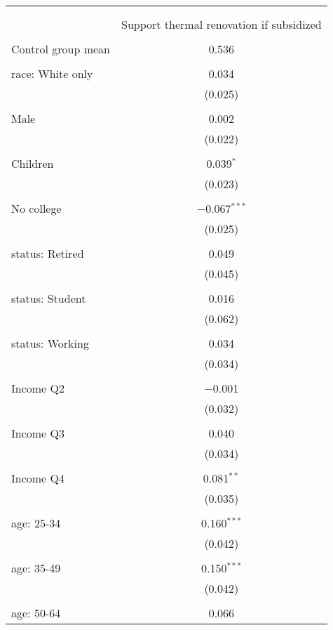 
\begin{tabular}{@{\extracolsep{5pt}}lc} 
\\[-1.8ex]\hline 
\hline \\[-1.8ex] 
\\[-1.8ex] & Support thermal renovation if subsidized \\ 
\hline \\[-1.8ex] 
 Control group mean & 0.536  \\ \hline \\[-1.8ex] race: White only & 0.034 \\ 
  & (0.025) \\ 
  & \\ 
 Male & 0.002 \\ 
  & (0.022) \\ 
  & \\ 
 Children & 0.039$^{*}$ \\ 
  & (0.023) \\ 
  & \\ 
 No college & $-$0.067$^{***}$ \\ 
  & (0.025) \\ 
  & \\ 
 status: Retired & 0.049 \\ 
  & (0.045) \\ 
  & \\ 
 status: Student & 0.016 \\ 
  & (0.062) \\ 
  & \\ 
 status: Working & 0.034 \\ 
  & (0.034) \\ 
  & \\ 
 Income Q2 & $-$0.001 \\ 
  & (0.032) \\ 
  & \\ 
 Income Q3 & 0.040 \\ 
  & (0.034) \\ 
  & \\ 
 Income Q4 & 0.081$^{**}$ \\ 
  & (0.035) \\ 
  & \\ 
 age: 25-34 & 0.160$^{***}$ \\ 
  & (0.042) \\ 
  & \\ 
 age: 35-49 & 0.150$^{***}$ \\ 
  & (0.042) \\ 
  & \\ 
 age: 50-64 & 0.066 \\ 

\end{tabular}
